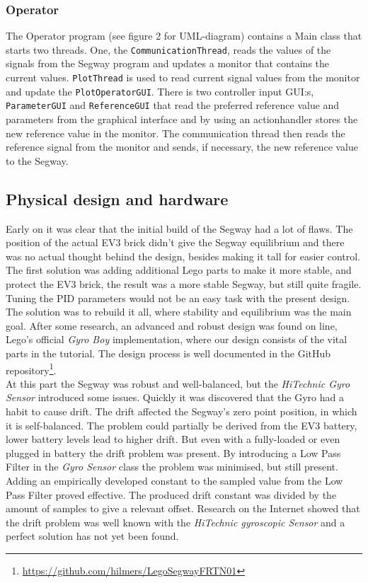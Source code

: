 \subsubsection{Operator}
The Operator program (see figure 2 for UML-diagram)  contains a Main class that starts two threads. One, the \texttt{CommunicationThread}, reads the values of the signals from the Segway program and updates a monitor that contains the current values. \texttt{PlotThread} is used to read current signal values from the monitor and update the \texttt{PlotOperatorGUI}. There is two controller input GUI:s, \texttt{ParameterGUI} and \texttt{ReferenceGUI} that read the preferred reference value and parameters from the graphical interface and by using an actionhandler stores the new reference value in the monitor. The communication thread then reads the reference signal from the monitor and sends, if necessary, the new reference value to the Segway.

\subsection{Physical design and hardware}
Early on it was clear that the initial build of the Segway had a lot of flaws. The position of the actual EV3 brick didn't give the Segway equilibrium and there was no actual thought behind the design, besides making it tall for easier control. The first solution was adding additional Lego parts to make it more stable, and protect the EV3 brick, the result was a more stable Segway, but still quite fragile.
Tuning the PID parameters would not be an easy task with the present design. The solution was to rebuild it all, where stability and equilibrium was the main goal. After some research, an advanced and robust design was found on line, Lego's official {\it Gyro Boy} \cite{gyroboy} implementation, where our design consists of the vital parts in the tutorial. The design process is well documented in the GitHub repository\footnote{\url{https://github.com/hilmers/LegoSegwayFRTN01}}. 
\\[3ex]
At this part the Segway was robust and well-balanced, but the {\it HiTechnic Gyro Sensor} introduced some issues. Quickly it was discovered that the Gyro had a habit to cause drift. The drift affected the Segway's zero point position, in which it is self-balanced. The problem could partially be derived from the EV3 battery, lower battery levels lead to higher drift. But even with a fully-loaded or even plugged in battery the drift problem was present. By introducing a Low Pass Filter in the {\it Gyro Sensor} class the problem was minimised, but still present. Adding an empirically developed constant to the sampled value from the Low Pass Filter proved effective. The produced drift constant was divided by the amount of samples to give a relevant offset. 
Research on the Internet showed that the drift problem was well known with the {\it HiTechnic gyroscopic Sensor} and a perfect solution has not yet been found.         

